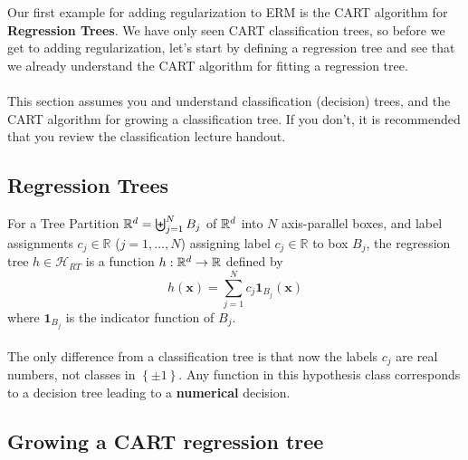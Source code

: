 \documentclass[11pt]{article}
\newcommand{\R}{\ensuremath{\mathbb{R}}}
\newcommand{\Hc}{\mathcal{H}}
\newcommand{\VV}[1]{\mathbf{#1}}
\begin{document}
    Our first example for adding regularization to ERM is the CART algorithm for
    {\bf Regression Trees}. We have only seen CART classification trees, so before we
    get to adding regularization, let's
    start by defining a regression tree and see that we already understand the
    CART algorithm for fitting a regression tree.
\\~\\
     This section assumes you and understand classification (decision)
    trees, and the CART algorithm for growing a classification tree. If you
    don't, it is recommended that you review the classification lecture handout. 
   

    

    \subsection{Regression Trees}

    For a Tree Partition $\mathbb{R}^d=\biguplus_{j=1}^N B_j$ of
     $\mathbb{R}^d$ into $N$ axis-parallel boxes, and label assignments $c_j \in \R$
     ($j=1,\ldots, N$) assigning label $c_j\in \R$ to box $B_j$, the
     regression tree $h\in\Hc_{RT}$ is a function
     $h:\reals^d\to\R$
      defined by 
     \[
       h(\VV{x}) = \sum_{j=1}^N c_j \mathbf{1}_{B_j}(\VV{x})
     \]
     where $\mathbf{1}_{B_j}$ is the indicator function of $B_j$. 
\\~\\
  The only difference from a classification tree is that now the labels $c_j$
  are real numbers, not classes in $\left\{ \pm 1 \right\}$. 
  Any function in this hypothesis class corresponds to a decision tree leading
  to a {\bf numerical} decision. 

    \subsection{Growing a CART regression tree}
\end{document}
